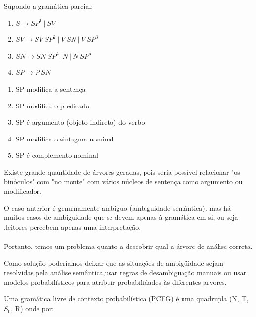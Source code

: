 Supondo a gramática parcial:

\begin{enumerate}
  \item $ S \rightarrow SP^1 \ |\ SV $
  \item $ SV \rightarrow SV \ SP^2  \ |\  V \ SN \ |\ V \ SP^3 $
  \item $ SN \rightarrow SN \ SP^4  | \  N \  |  \ N \ SP^5 $
  \item $ SP \rightarrow P \ SN  $
\end{enumerate}

\begin{enumerate}
    \tiny
    \item SP modifica a sentença
    \item SP modifica o predicado
    \item SP é argumento (objeto indireto) do verbo
    \item SP modifica o sintagma nominal
    \item SP é complemento nominal
\end{enumerate}


Existe grande quantidade de árvores geradas, pois seria possível relacionar "os binóculos" com "no monte" com vários núcleos de sentença como argumento ou modificador.


O caso anterior é genuinamente ambíguo (ambiguidade semântica), mas há muitos casos de ambiguidade que se devem apenas à gramática em si, ou seja ,leitores percebem apenas uma interpretação.
\\ \\


 Portanto, temos um problema quanto a descobrir qual a árvore de análise correta.

 Como solução poderíamos deixar que as situações de ambigüidade sejam resolvidas pela análise semântica,usar regras de desambiguação manuais ou usar modelos probabilísticos para atribuir probabilidades às diferentes arvores.


 Uma gramática livre de contexto probabilística (PCFG) é uma quadrupla (N, T, $S_0$, R) onde por:

